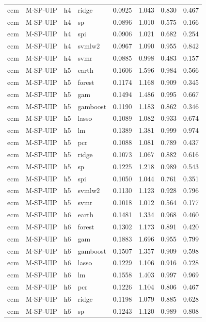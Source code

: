 \begin{ThreePartTable}
\begin{longtable}[t]{llclcccc}
ecm & M-SP-UIP & h4 & ridge & 0.0925 & 1.043 & 0.830 & 0.467\\
ecm & M-SP-UIP & h4 & sp & 0.0896 & 1.010 & 0.575 & 0.166\\
ecm & M-SP-UIP & h4 & spi & 0.0906 & 1.021 & 0.682 & 0.254\\
ecm & M-SP-UIP & h4 & svmlw2 & 0.0967 & 1.090 & 0.955 & 0.842\\
ecm & M-SP-UIP & h4 & svmr & 0.0885 & 0.998 & 0.483 & 0.157\\
\addlinespace
ecm & M-SP-UIP & h5 & earth & 0.1606 & 1.596 & 0.984 & 0.566\\
ecm & M-SP-UIP & h5 & forest & 0.1174 & 1.168 & 0.909 & 0.345\\
ecm & M-SP-UIP & h5 & gam & 0.1494 & 1.486 & 0.995 & 0.667\\
ecm & M-SP-UIP & h5 & gamboost & 0.1190 & 1.183 & 0.862 & 0.346\\
ecm & M-SP-UIP & h5 & lasso & 0.1089 & 1.082 & 0.933 & 0.674\\
ecm & M-SP-UIP & h5 & lm & 0.1389 & 1.381 & 0.999 & 0.974\\
ecm & M-SP-UIP & h5 & pcr & 0.1088 & 1.081 & 0.789 & 0.437\\
ecm & M-SP-UIP & h5 & ridge & 0.1073 & 1.067 & 0.882 & 0.616\\
ecm & M-SP-UIP & h5 & sp & 0.1225 & 1.218 & 0.989 & 0.543\\
ecm & M-SP-UIP & h5 & spi & 0.1050 & 1.044 & 0.761 & 0.351\\
ecm & M-SP-UIP & h5 & svmlw2 & 0.1130 & 1.123 & 0.928 & 0.796\\
ecm & M-SP-UIP & h5 & svmr & 0.1018 & 1.012 & 0.564 & 0.177\\
\addlinespace
ecm & M-SP-UIP & h6 & earth & 0.1481 & 1.334 & 0.968 & 0.460\\
ecm & M-SP-UIP & h6 & forest & 0.1302 & 1.173 & 0.891 & 0.420\\
ecm & M-SP-UIP & h6 & gam & 0.1883 & 1.696 & 0.955 & 0.799\\
ecm & M-SP-UIP & h6 & gamboost & 0.1507 & 1.357 & 0.909 & 0.598\\
ecm & M-SP-UIP & h6 & lasso & 0.1229 & 1.106 & 0.916 & 0.728\\
ecm & M-SP-UIP & h6 & lm & 0.1558 & 1.403 & 0.997 & 0.969\\
ecm & M-SP-UIP & h6 & pcr & 0.1226 & 1.104 & 0.806 & 0.467\\
ecm & M-SP-UIP & h6 & ridge & 0.1198 & 1.079 & 0.885 & 0.628\\
ecm & M-SP-UIP & h6 & sp & 0.1243 & 1.120 & 0.989 & 0.808\\

\end{longtable}
\end{ThreePartTable}
